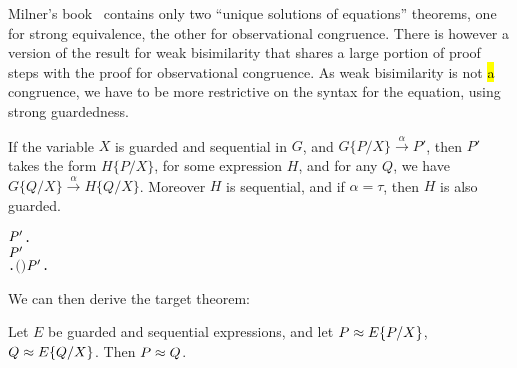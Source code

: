 Milner's book~\cite{Mil89} contains only two ``unique solutions of
equations'' theorems, one for strong equivalence, the other for
observational congruence.   There is however a
version  of the result for weak bisimilarity that shares a large portion of proof
steps with the proof for observational congruence.  
As  weak bisimilarity 
 is not \hl{a} congruence, we have to be more restrictive on the syntax for
 the equation, using strong guardedness.
\begin{lemma}
If the variable $X$ is guarded and sequential in $G$, and
$G\{P/X\}\overset{\alpha}{\rightarrow} P'$, then $P'$ takes the form
$H\{P/X\}$, for some expression $H$, and for any $Q$, we have
$G\{Q/X\}\overset{\alpha}{\rightarrow} H\{Q/X\}$. Moreover $H$ is
sequential, and if $\alpha = \tau$, then $H$ is also guarded.
\begin{alltt}
\HOLTokenTurnstile{}   \HOLSymConst{\HOLTokenConj{}}   \HOLSymConst{\HOLTokenImp{}}
   \HOLSymConst{\HOLTokenForall{}}  \ensuremath{\HOLBoundVar{P}\sp{\prime}}.
         \HOLTokenTransBegin{}\HOLTokenTransEnd \ensuremath{\HOLBoundVar{P}\sp{\prime}} \HOLSymConst{\HOLTokenImp{}}
       \HOLSymConst{\HOLTokenExists{}}.   \HOLSymConst{\HOLTokenConj{}} \ensuremath{(} \HOLSymConst{\ensuremath{=}} \HOLSymConst{\ensuremath{\tau}} \HOLSymConst{\HOLTokenImp{}}  \ensuremath{)} \HOLSymConst{\HOLTokenConj{}} \ensuremath{\HOLBoundVar{P}\sp{\prime}} \HOLSymConst{\ensuremath{=}}   \HOLSymConst{\HOLTokenConj{}} \HOLSymConst{\HOLTokenForall{}}.   \HOLTokenTransBegin{}\HOLTokenTransEnd {} 
\end{alltt}
\end{lemma}

We can then derive the target theorem:
\begin{theorem}
Let $E$ be guarded and sequential expressions, and let $P \approx
E\{P/X\}$,
$Q \approx E\{Q/X\}$. Then $P \approx Q$.
\begin{alltt}
\HOLTokenTurnstile{}   \HOLSymConst{\HOLTokenConj{}}   \HOLSymConst{\HOLTokenConj{}}  \HOLSymConst{\HOLTokenWeakEQ}   \HOLSymConst{\HOLTokenConj{}}  \HOLSymConst{\HOLTokenWeakEQ}   \HOLSymConst{\HOLTokenImp{}}  \HOLSymConst{\HOLTokenWeakEQ} 
\end{alltt}
\end{theorem}

